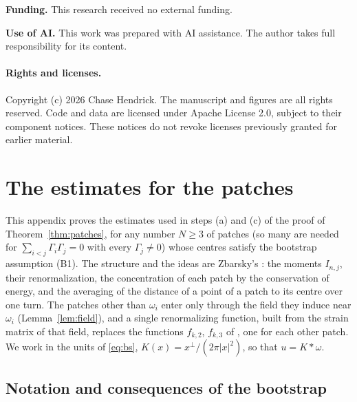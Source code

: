 \documentclass[11pt]{article}
\theoremstyle{definition}
\begin{document}
\smallskip
\noindent\textbf{Funding.} This research received no external funding.

\noindent\textbf{Use of AI.} This work was prepared with AI assistance. The author takes full responsibility for its content.

\paragraph{Rights and licenses.}
Copyright (c) 2026 Chase Hendrick. The manuscript and figures are all rights reserved. Code and data are licensed under Apache License 2.0, subject to their component notices. These notices do not revoke licenses previously granted for earlier material.

\appendix
\section{The estimates for the patches}\label{app:patches}

This appendix proves the estimates used in steps (a) and (c) of the proof of Theorem~\ref{thm:patches}, for any number $N \ge 3$ of patches (so many are needed for $\sum_{i<j}\Gamma_i\Gamma_j = 0$ with every $\Gamma_j \ne 0$) whose centres satisfy the bootstrap assumption (B1). The structure and the ideas are Zbarsky's \cite{zbarsky2021}: the moments $I_{n,j}$, their renormalization, the concentration of each patch by the conservation of energy, and the averaging of the distance of a point of a patch to its centre over one turn. The patches other than $\omega_i$ enter only through the field they induce near $\omega_i$ (Lemma~\ref{lem:field}), and a single renormalizing function, built from the strain matrix of that field, replaces the functions $f_{k,2}$, $f_{k,3}$ of \cite{zbarsky2021}, one for each other patch. We work in the units of \eqref{eq:bs}, $K(x) = x^\perp/(2\pi|x|^2)$, so that $u = K*\omega$.

\subsection{Notation and consequences of the bootstrap}
\end{document}
